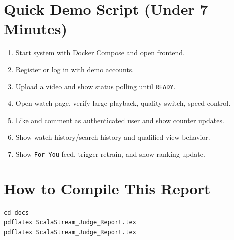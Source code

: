 \documentclass[11pt,a4paper]{article}
\begin{document}
\section{Quick Demo Script (Under 7 Minutes)}
\begin{enumerate}[leftmargin=1.4em]
  \item Start system with Docker Compose and open frontend.
  \item Register or log in with demo accounts.
  \item Upload a video and show status polling until \texttt{READY}.
  \item Open watch page, verify large playback, quality switch, speed control.
  \item Like and comment as authenticated user and show counter updates.
  \item Show watch history/search history and qualified view behavior.
  \item Show \texttt{For You} feed, trigger retrain, and show ranking update.
\end{enumerate}

\section{How to Compile This Report}
\begin{lstlisting}[style=plain]
cd docs
pdflatex ScalaStream_Judge_Report.tex
pdflatex ScalaStream_Judge_Report.tex
\end{lstlisting}
\end{document}
